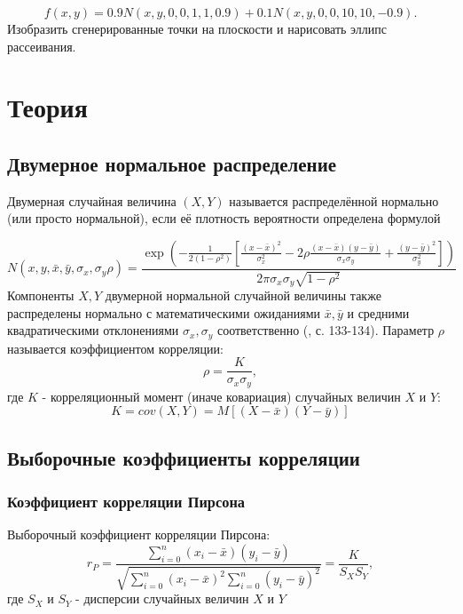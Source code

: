\documentclass[12pt,a4paper]{article}
\begin{document}
	\begin{equation}\label{mixed_normal}
		f(x,y)=0.9N(x,y,0,0,1,1,0.9)+0.1N(x,y,0,0,10,10,-0.9).
	\end{equation} 
	Изобразить сгенерированные точки на плоскости и нарисовать эллипс рассеивания.
	\newpage
	
	\section{Теория}
		\subsection{Двумерное нормальное распределение}
			Двумерная случайная величина $(X, Y)$ называется распределённой нормально (или просто нормальной), если её плотность вероятности определена формулой

			\begin{equation}\label{bivariate_normal}
				N(x,y,\bar{x}, \bar{y}, \sigma_x, \sigma_y 	\rho)=\frac{\exp{(-\frac{1}{2(1-\rho^2)}[\frac{(x-\bar{x})^2}{\sigma_x^2}-2\rho\frac{(x-\bar{x})(y-\bar{y})}{\sigma_x\sigma_y} +\frac{(y-\bar{y})^2}{\sigma_y^2}])}}{2\pi \sigma_x \sigma_y \sqrt{1-\rho^2}}
			\end{equation}
			Компоненты $X, Y$ двумерной нормальной случайной величины также распределены нормально с математическими ожиданиями $\bar{x}, \bar{y}$ и средними квадратическими отклонениями $\sigma_x, \sigma_y$ соответственно (\cite{coeffs}, с. 133-134).
			Параметр $\rho$ называется коэффициентом корреляции:
			\begin{equation}
				\rho = \frac{K}{\sigma_x\sigma_y},
			\end{equation}
			где $K$ - корреляционный момент (иначе ковариация) случайных величин $X$ и $Y$:
			\begin{equation}
				K = cov(X, Y) = M[(X-\bar{x})(Y-\bar{y})]
			\end{equation}
		\subsection{Выборочные коэффициенты корреляции}
			\subsubsection{Коэффициент корреляции Пирсона}
				Выборочный коэффициент корреляции Пирсона:
				\begin{equation}\label{pearson}
					r_P = \frac{\sum_{i=0}^{n}(x_i-\bar{x})(y_i-\bar{y})}{\sqrt{\sum_{i=0}^{n}(x_i-\bar{x})^2\sum_{i=0}^{n}(y_i-\bar{y})^2}} = \frac{K}{S_X S_Y},
				\end{equation}
				где $S_X$ и $S_Y$ - дисперсии случайных величин $X$ и $Y$
\end{document}
